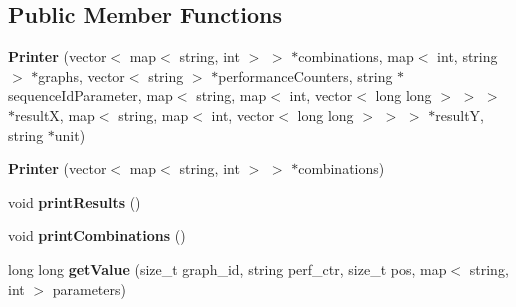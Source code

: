 \subsection*{Public Member Functions}
\begin{DoxyCompactItemize}
\item 
\hypertarget{classPrinter_a6d1f892618048faf7c184a858a5e37c1}{{\bfseries Printer} (vector$<$ map$<$ string, int $>$ $>$ $\ast$combinations, map$<$ int, string $>$ $\ast$graphs, vector$<$ string $>$ $\ast$performance\-Counters, string $\ast$sequence\-Id\-Parameter, map$<$ string, map$<$ int, vector$<$ long long $>$ $>$ $>$ $\ast$result\-X, map$<$ string, map$<$ int, vector$<$ long long $>$ $>$ $>$ $\ast$result\-Y, string $\ast$unit)}\label{classPrinter_a6d1f892618048faf7c184a858a5e37c1}

\item 
\hypertarget{classPrinter_abed7c1d0fb8406e91a7e80c8072c250d}{{\bfseries Printer} (vector$<$ map$<$ string, int $>$ $>$ $\ast$combinations)}\label{classPrinter_abed7c1d0fb8406e91a7e80c8072c250d}

\item 
\hypertarget{classPrinter_a9f0c5c15fff8911a9fc6445d8fe2083b}{void {\bfseries print\-Results} ()}\label{classPrinter_a9f0c5c15fff8911a9fc6445d8fe2083b}

\item 
\hypertarget{classPrinter_aeff8cda87654151a566b0d163f588628}{void {\bfseries print\-Combinations} ()}\label{classPrinter_aeff8cda87654151a566b0d163f588628}

\item 
\hypertarget{classPrinter_ad628f7c64bd0a2e8c49f25cb6919047b}{long long {\bfseries get\-Value} (size\-\_\-t graph\-\_\-id, string perf\-\_\-ctr, size\-\_\-t pos, map$<$ string, int $>$ parameters)}\label{classPrinter_ad628f7c64bd0a2e8c49f25cb6919047b}

\end{DoxyCompactItemize}
